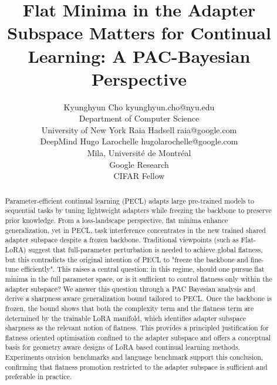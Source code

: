 \documentclass[10pt]{article} %
\title{Flat Minima in the Adapter Subspace Matters for Continual Learning: A PAC-Bayesian Perspective}
\author{\name Kyunghyun Cho \email kyunghyun.cho@nyu.edu \\
      \addr Department of Computer Science\\
      University of New York
      \AND
      \name Raia Hadsell \email raia@google.com \\
      \addr DeepMind
      \AND
      \name Hugo Larochelle \email hugolarochelle@google.com\\
      \addr Mila, Universit\'e de Montr\'eal \\
      Google Research\\
      CIFAR Fellow}
\begin{document}
\maketitle

\begin{abstract}

Parameter-efficient continual learning (PECL) adapts large pre-trained models to sequential tasks by tuning lightweight adapters while freezing the backbone to preserve prior knowledge.
From a loss-landscape perspective, flat minima enhance generalization, yet in PECL, task interference concentrates in the new trained shared adapter subspace despite a frozen backbone. 
Traditional viewpoints (such as Flat-LoRA) suggest that full-parameter perturbation is needed to achieve global flatness, but this contradicts the original intention of PECL to "freeze the backbone and fine-tune efficiently".
This raises a central question: in this regime, should one pursue flat minima in the full parameter space, or is it sufficient to control flatness only within the adapter subspace? 
We answer this question through a PAC Bayesian analysis and derive a sharpness aware generalization bound tailored to PECL. 
Once the backbone is frozen, the bound shows that both the complexity term and the flatness term are determined by the trainable LoRA manifold, which identifies adapter subspace sharpness as the relevant notion of flatness.
This provides a principled justification for flatness oriented optimisation confined to the adapter subspace and offers a conceptual basis for geometry aware designs of LoRA based continual learning methods. Experiments onvision benchmarks and language benchmark support this conclusion, confirming that flatness promotion restricted to the adapter subspace is sufficient and preferable in practice.

\end{abstract}
\end{document}
